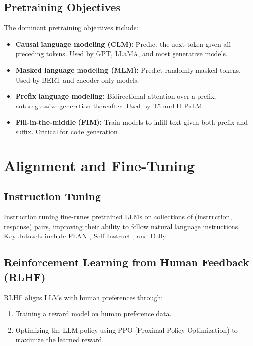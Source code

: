 \documentclass[
    language=english,
    doctype=review-article,
    institution=none,
]{../../omnilatex}
\begin{document}
\subsection{Pretraining Objectives}

The dominant pretraining objectives include:

\begin{itemize}
    \item \textbf{Causal language modeling (CLM):} Predict the next token
          given all preceding tokens. Used by GPT, LLaMA, and most generative
          models.
    \item \textbf{Masked language modeling (MLM):} Predict randomly masked
          tokens. Used by BERT and encoder-only models.
    \item \textbf{Prefix language modeling:} Bidirectional attention over a
          prefix, autoregressive generation thereafter. Used by T5 \cite{raffel2020exploring}
          and U-PaLM.
    \item \textbf{Fill-in-the-middle (FIM):} Train models to infill text
          given both prefix and suffix. Critical for code generation.
\end{itemize}

\section{Alignment and Fine-Tuning}
\label{sec:alignment}

\subsection{Instruction Tuning}

Instruction tuning \cite{ouyang2022training} fine-tunes pretrained LLMs on
collections of (instruction, response) pairs, improving their ability to
follow natural language instructions. Key datasets include FLAN \cite{wei2021finetuned},
Self-Instruct \cite{wang2023self}, and Dolly.

\subsection{Reinforcement Learning from Human Feedback (RLHF)}

RLHF \cite{ouyang2022training} aligns LLMs with human preferences through:
\begin{enumerate}
    \item Training a reward model on human preference data.
    \item Optimizing the LLM policy using PPO (Proximal Policy Optimization)
          to maximize the learned reward.
\end{enumerate}
\end{document}
